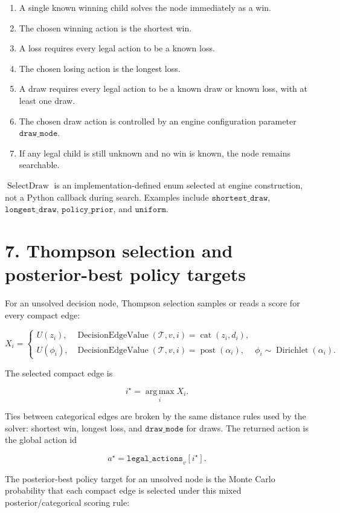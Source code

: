 \documentclass[11pt]{article}
\newcommand{\Dir}{\operatorname{Dirichlet}}
\newcommand{\argmax}{\operatorname*{arg\,max}}
\newcommand{\Tree}{\mathcal{T}}
\newcommand{\Utility}{U}
\newcommand{\Cat}{\operatorname{cat}}
\newcommand{\Posterior}{\operatorname{post}}
\newcommand{\SelectDraw}{\operatorname{SelectDraw}}
\newcommand{\DecisionEdgeValue}{\operatorname{DecisionEdgeValue}}
\begin{document}
\begin{enumerate}[leftmargin=2em]
  \item A single known winning child solves the node immediately as a win.
  \item The chosen winning action is the shortest win.
  \item A loss requires every legal action to be a known loss.
  \item The chosen losing action is the longest loss.
  \item A draw requires every legal action to be a known draw or known loss,
  with at least one draw.
  \item The chosen draw action is controlled by an engine configuration parameter
  \(\texttt{draw\_mode}\).
  \item If any legal child is still unknown and no win is known, the node
  remains searchable.
\end{enumerate}

\(\SelectDraw\) is an implementation-defined enum selected at engine
construction, not a Python callback during search. Examples include
\(\texttt{shortest\_draw}\), \(\texttt{longest\_draw}\),
\(\texttt{policy\_prior}\), and \(\texttt{uniform}\).

\section*{7. Thompson selection and posterior-best policy targets}

For an unsolved decision node, Thompson selection samples or reads a score for
every compact edge:

\[
X_i=
\begin{cases}
\Utility(z_i),&\DecisionEdgeValue(\Tree,v,i)=\Cat(z_i,d_i),\\[2pt]
\Utility(\phi_i),&\DecisionEdgeValue(\Tree,v,i)=\Posterior(\alpha_i),\
\quad \phi_i\sim\Dir(\alpha_i).
\end{cases}
\]

The selected compact edge is

\[
i^\star=\argmax_i X_i.
\]

Ties between categorical edges are broken by the same distance rules used by the
solver: shortest win, longest loss, and \(\texttt{draw\_mode}\) for draws. The
returned action is the global action id

\[
a^\star=\texttt{legal\_actions}_v[i^\star].
\]

The posterior-best policy target for an unsolved node is the Monte Carlo
probability that each compact edge is selected under this mixed
posterior/categorical scoring rule:
\end{document}
